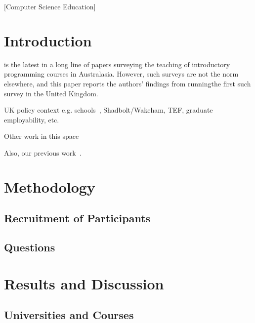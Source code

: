 \documentclass{sig-alternate}
\begin{document}
[Computer Science Education]

\section{Introduction}\label{intro}

\cite{mason+cooper:2014} is the latest in a long line \cite{deraadt-et-al:2004,mason-et-al:2012} of papers surveying the teaching of introductory programming courses in Australasia. However, such surveys are not the norm elsewhere, and this paper reports the authors' findings from runningthe first such survey in the United Kingdom.

UK policy context
e.g. schools~\cite{brown-et-al-sigcse2013,brown-et-al-toce2014},
Shadbolt/Wakeham, TEF, graduate employability, etc.

Other work in this
space~\cite{mccracken-et-al:2001,gupta:2004,dale:2006,pears-et-al:2007,guo:2014}

Also, our previous work~\cite{crick-et-al-hea:2015,davenport-et-al:latice2016}.


\section{Methodology}\label{method}

\subsection{Recruitment of Participants}

\subsection{Questions}


\section{Results and Discussion}\label{results}

\subsection{Universities and Courses}
\end{document}
